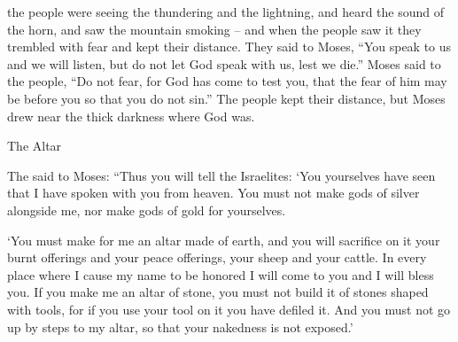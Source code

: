 {the people
were seeing
the thundering
and the lightning,
and heard
the sound
of the horn,
and saw the mountain
smoking
– and when the people
saw
it they trembled
with fear and kept
their
distance.
They said
to
Moses,
“You
speak
to us
and we
will listen,
but do not
let God
speak
with
us, lest
we die.”
Moses
said
to
the people,
“Do not
fear,
for
God
has come
to test
you, that the fear
of him
may
be
before
you so that you do not
sin.”
The people
kept
their distance,
but Moses
drew near
the thick darkness
where
God was.
\par }{\SH The Altar
\par }{\PP {}The
{}
said
to
Moses: “Thus
you will tell
the Israelites: ‘You yourselves
have seen
that
I have spoken
with
you from
heaven.
You must not
make
gods
of silver
alongside
me, nor
make
gods
of gold for yourselves.
\par }{\PP {}‘You must make for me an altar
made
of earth,
and you will sacrifice
on
it your burnt offerings
and your peace offerings,
your sheep
and your cattle.
In every
place
where
I cause
my name
to
be honored
I will come
to
you and I will bless you.
If
you make
me an altar
of stone,
you must not
build
it of stones shaped with tools,
for if
you use
your tool
on
it you have defiled it.
And you must not
go up
by steps
to my altar,
so that
your nakedness
is not
exposed.’


}
